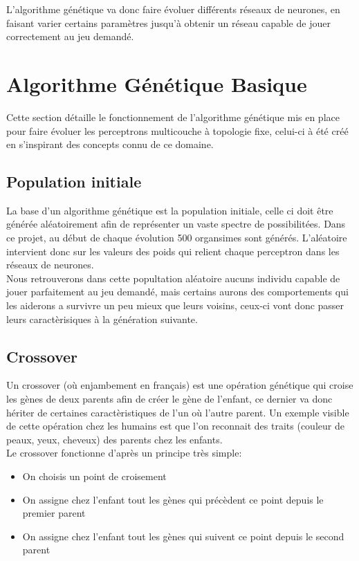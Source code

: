 \documentclass{article}
\begin{document}
L'algorithme génétique va donc faire évoluer différents réseaux de neurones, en faisant varier certains paramètres jusqu'à obtenir un réseau capable de jouer correctement au jeu demandé.

\section{Algorithme Génétique Basique}

Cette section détaille le fonctionnement de l'algorithme génétique mis en place pour faire évoluer les perceptrons multicouche à topologie fixe, celui-ci à été créé en s'inspirant des concepts connu de ce domaine.

\subsection{Population initiale}

La base d'un algorithme génétique est la population initiale, celle ci doit être générée aléatoirement afin de représenter un vaste spectre de possibilitées. Dans ce projet, au début de chaque évolution 500 organsimes sont générés. L'aléatoire intervient donc sur les valeurs des poids qui relient chaque perceptron dans les réseaux de neurones.\\
Nous retrouverons dans cette popultation aléatoire aucuns individu capable de jouer parfaitement au jeu demandé, mais certains aurons des comportements qui les aiderons a survivre un peu mieux que leurs voisins, ceux-ci vont donc passer leurs caractèrisiques à la génération suivante.

\subsection{Crossover}

Un crossover (où enjambement en français) est une opération génétique qui croise les gènes de deux parents afin de créer le gène de l'enfant, ce dernier va donc hériter de certaines caractèristiques de l'un où l'autre parent. Un exemple visible de cette opération chez les humains est que l'on reconnait des traits (couleur de peaux, yeux, cheveux) des parents chez les enfants.\\

Le crossover fonctionne d'après un principe très simple:\\
\begin{itemize}
\item On choisis un point de croisement
\item On assigne chez l'enfant tout les gènes qui précèdent ce point depuis le premier parent
\item On assigne chez l'enfant tout les gènes qui suivent ce point depuis le second parent
\end{itemize}
\end{document}
